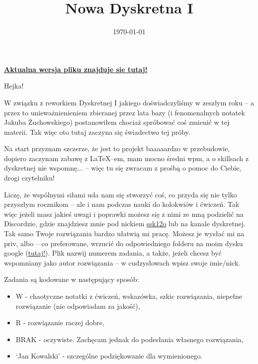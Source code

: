 \documentclass{mwbk}
\begin{document}
\title{Nowa Dyskretna I}
\author{}
\date{\today}
\maketitle

\begin{center}
    \textbf{\href{https://drive.google.com/drive/folders/1ma90kiyWDu3Lr4yZNFwNr48FS1fOthvE}{Aktualna wersja pliku znajduje sie tutaj! }}
\end{center}



Hejka!

W związku z reworkiem Dyskretnej I jakiego doświadczyliśmy w zeszłym
roku -- a przez to unieważnienieniem zbieranej przez lata bazy (i
fenomenalnych notatek Jakuba Żuchowskiego) postanowiłem chociaż
spróbować coś zmienić w tej materii. Tak więc oto tutaj zaczyna się
świadectwo tej próby. \newline


Na start przyznam szczerze, że jest to projekt baaaaardzo w przebudowie,
dopiero zaczynam zabawę z \LaTeX --em, mam mocno średni wpm, a o skillsach
z dyskretnej nie wspomnę... -- więc tu się zwracam z prośbą o pomoc do
Ciebie, drogi czytelniku!\newline

Liczę, że wspólnymi siłami uda nam się stworzyć coś, co przyda się
nie tylko przyszłym rocznikom -- ale i nam podczas nauki do kolokwiów
i ćwiczeń. Tak więc jeżeli masz jakieś uwagi i poprawki możesz
się z nimi ze mną podzielić na Discordzie, gdzie znajdziesz mnie pod nickiem \url{ssk12o}
lub na kanale dyskretnej. Tak samo Twoje rozwiązania bardzo ułatwią mi pracę.
Możesz je wysłać mi na priv, albo -- co preferowane, wrzucić do odpowiedniego folderu
na moim dysku google (\href{https://drive.google.com/drive/folders/1ma90kiyWDu3Lr4yZNFwNr48FS1fOthvE?usp=sharing}{tutaj!}).
Plik nazwij numerem zadania, a także, jeżeli chcesz być wspomniany jako autor rozwiązania -- w cudzysłowach wpisz swoje imie/nick. \newline



Zadania są kodowane w następujący sposób:
\begin{itemize}
    \item W     - chaotyczne notatki z ćwiczeń, wskazówka, szkic rozwiązania, niepełne rozwiązanie (nie odpowiadam za jakość),
    \item R    - rozwiązanie raczej dobre,
    \item BRAK  - oczywiste. Zachęcam jednak do podesłania własnego rozwiązania,
    \item `Jan Kowalski' - szczególne podziękowanie dla wymienionego.
\end{itemize}
\end{document}
